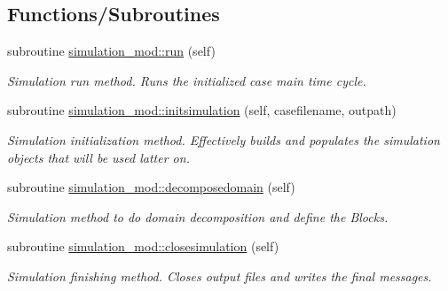 \subsection*{Functions/\+Subroutines}
\begin{DoxyCompactItemize}
\item 
subroutine \hyperlink{namespacesimulation__mod_a73bd78c4ac76c51f1e10f5847c25c4df}{simulation\+\_\+mod\+::run} (self)
\begin{DoxyCompactList}\small\item\em Simulation run method. Runs the initialized case main time cycle. \end{DoxyCompactList}\item 
subroutine \hyperlink{namespacesimulation__mod_aedbba2bb458cbcd7eb93938a5f7b5940}{simulation\+\_\+mod\+::initsimulation} (self, casefilename, outpath)
\begin{DoxyCompactList}\small\item\em Simulation initialization method. Effectively builds and populates the simulation objects that will be used latter on. \end{DoxyCompactList}\item 
subroutine \hyperlink{namespacesimulation__mod_a2b8198a9fb3f7671c6b45192a0b9740c}{simulation\+\_\+mod\+::decomposedomain} (self)
\begin{DoxyCompactList}\small\item\em Simulation method to do domain decomposition and define the Blocks. \end{DoxyCompactList}\item 
subroutine \hyperlink{namespacesimulation__mod_a4285722eaa589fa671233554b54c74f8}{simulation\+\_\+mod\+::closesimulation} (self)
\begin{DoxyCompactList}\small\item\em Simulation finishing method. Closes output files and writes the final messages. \end{DoxyCompactList}\end{DoxyCompactItemize}
